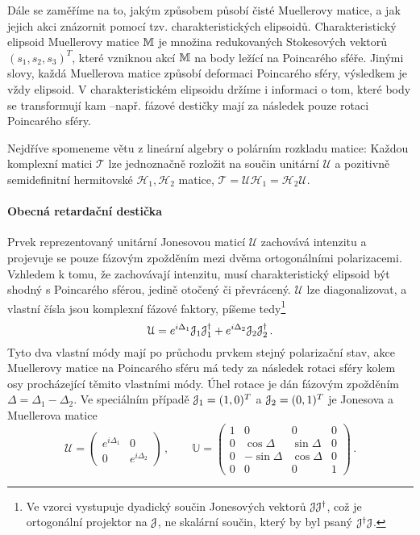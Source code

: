 Dále se zaměříme na to, jakým způsobem působí čisté Muellerovy matice, a jak jejich akci znázornit pomocí tzv. charakteristických elipsoidů.
Charakteristický elipsoid Muellerovy matice $\mathbb{M}$ je množina redukovaných Stokesových vektorů $(s_1, s_2, s_3)^T$, které vzniknou akcí $\mathbb{M}$ na body ležící na Poincarého sféře.
Jinými slovy, každá Muellerova matice způsobí deformaci Poincarého sféry, výsledkem je vždy elipsoid.
V charakteristickém elipsoidu držíme i informaci o tom, které body se transformují kam --\tododash např. fázové destičky mají za následek pouze rotaci Poincarého sféry.

Nejdříve spomeneme větu z lineární algebry o polárním rozkladu matice: Každou komplexní matici $\mathcal{T}$ lze jednoznačně rozložit na součin unitární $\mathcal{U}$ a pozitivně semidefinitní hermitovské $\mathcal{H}_1, \mathcal{H}_2$ matice, $\mathcal{T}=\mathcal{U}\mathcal{H}_1 = \mathcal{H}_2 \mathcal{U}$.

\paragraph{Obecná retardační destička}

Prvek reprezentovaný unitární Jonesovou maticí $\mathcal{U}$ zachovává intenzitu a projevuje se pouze fázovým zpožděním mezi dvěma ortogonálními polarizacemi.
Vzhledem k tomu, že zachovávají intenzitu, musí charakteristický elipsoid být shodný s Poincarého sférou, jedině otočený či převrácený.
$\mathcal{U}$ lze diagonalizovat, a vlastní čísla jsou komplexní fázové faktory, píšeme tedy\footnote{Ve vzorci vystupuje dyadický součin Jonesových vektorů $\mathcal{J}\mathcal{J}^\dagger$, což je ortogonální projektor na $\mathcal{J}$, ne skalární součin, který by byl psaný $\mathcal{J}^\dagger \mathcal{J}$.}
\begin{equation}
    \mathcal{U}=e^{i\Delta_1} \mathcal{J}_1 \mathcal{J}_1^\dagger + e^{i\Delta_2} \mathcal{J}_2 \mathcal{J}_2^\dagger\,.
\end{equation}
Tyto dva vlastní módy mají po průchodu prvkem stejný polarizační stav, akce Muellerovy matice na Poincarého sféru má tedy za následek rotaci sféry kolem osy procházející těmito vlastními módy.
Úhel rotace je dán fázovým zpožděním $\Delta=\Delta_1-\Delta_2$.
Ve speciálním případě $\mathcal{J}_1=(1,0)^T$ a $\mathcal{J}_2=(0,1)^T$ je Jonesova a Muellerova matice
\begin{equation}
    \mathcal{U}=\begin{pmatrix}
        e^{i\Delta_1} & 0 \\ 0 & e^{i\Delta_2}
        \end{pmatrix} \,, \qquad
    \mathbb{U}=\begin{pmatrix}
        1 & 0 & 0 & 0 \\ 0 & \cos\Delta & \sin\Delta & 0 \\
        0 & -\sin\Delta & \cos\Delta & 0 \\ 0 & 0 & 0 & 1
        \end{pmatrix} \,.
\end{equation}

